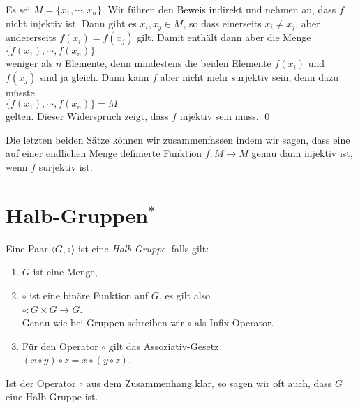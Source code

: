 \proof
Es sei $M = \{x_1, \cdots, x_n \}$.  Wir f\"{u}hren den Beweis indirekt und nehmen an, dass $f$ nicht injektiv
ist.  Dann gibt es $x_i, x_j \in M$, so dass einerseits $x_i \not= x_j$, aber andererseits $f(x_i) =
f(x_j)$ gilt.  
Damit enth\"{a}lt dann aber die Menge
\\[0.2cm]
\hspace*{1.3cm}
$\{ f(x_1), \cdots, f(x_n) \}$
\\[0.2cm]
weniger als $n$ Elemente, denn mindestens die beiden Elemente $f(x_i)$ und $f(x_j)$ sind ja gleich.
Dann kann $f$ aber nicht mehr surjektiv sein, denn dazu m\"{u}sste 
\\[0.2cm]
\hspace*{1.3cm}
$\{ f(x_1), \cdots, f(x_n) \} = M$
\\[0.2cm] 
gelten.  Dieser Widerspruch zeigt, dass $f$ injektiv sein muss.
\qed

\remark
Die letzten beiden S\"{a}tze k\"{o}nnen wir zusammenfassen indem wir sagen, dass eine auf einer endlichen
Menge definierte Funktion $f:M \rightarrow M$ genau dann injektiv ist, wenn $f$ surjektiv ist.
\eoxs
\vspace*{-0.4cm}

\section{Halb-Gruppen$^*$}
\begin{Definition}
  Eine Paar $\langle G, \circ \rangle$ ist eine \emph{\color{blue}Halb-Gruppe}, falls gilt:
  \begin{enumerate}
  \item $G$ ist eine Menge,
  \item $\circ$ ist eine bin\"{a}re Funktion auf $G$, es gilt also
        \\[0.2cm]
        \hspace*{1.3cm}
        $\circ: G \times G \rightarrow G$.
        \\[0.2cm]
        Genau wie bei Gruppen schreiben wir $\circ$ als Infix-Operator.
  \item F\"{u}r den Operator $\circ$ gilt das Assoziativ-Gesetz
        \\[0.2cm]
        \hspace*{1.3cm}
        $(x \circ y) \circ z = x \circ (y \circ z)$.
  \end{enumerate}
  Ist der Operator $\circ$ aus dem Zusammenhang klar, so sagen wir oft auch,
  dass $G$ eine Halb-Gruppe ist.  \eoxs
\end{Definition}
\vspace*{-0.4cm}

